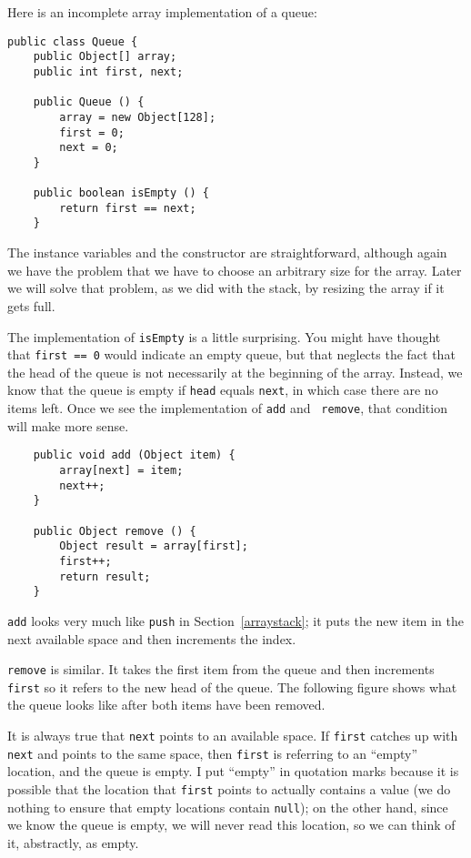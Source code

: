 Here is an incomplete array implementation of a queue:

\begin{verbatim}
public class Queue {
    public Object[] array;
    public int first, next;

    public Queue () {
        array = new Object[128];
        first = 0;
        next = 0;
    }

    public boolean isEmpty () {
        return first == next;
    }
\end{verbatim}
%
The instance variables and the constructor are straightforward,
although again we have the problem that we have to choose an
arbitrary size for the array.  Later we will solve that problem,
as we did with the stack, by resizing the array if it gets full.

The implementation of {\tt isEmpty} is a little surprising.  You might
have thought that {\tt first == 0} would indicate an empty queue, but
that neglects the fact that the head of the queue is not necessarily
at the beginning of the array.  Instead, we know that the queue is
empty if {\tt head} equals {\tt next}, in which case there are no
items left.  Once we see the implementation of {\tt add} and {\tt
remove}, that condition will make more sense.

\begin{verbatim}
    public void add (Object item) {
        array[next] = item;
        next++;
    }

    public Object remove () {
        Object result = array[first];
        first++;
        return result;
    }
\end{verbatim}
%
{\tt add} looks very much like {\tt push} in Section~\ref{arraystack};
it puts the new item in the next available space and then increments
the index.

{\tt remove} is similar.  It takes the first item from the queue
and then increments {\tt first} so it refers to the new head of the queue.
The following figure shows what the queue looks like after both
items have been removed.


It is always true that {\tt next} points to an available space.
If {\tt first} catches up with {\tt next} and points to the same
space, then {\tt first} is referring to an ``empty'' location,
and the queue is empty.  I put ``empty'' in quotation marks because
it is possible that the location that {\tt first} points to actually
contains a value (we do nothing to ensure that empty locations contain
{\tt null}); on the other hand, since we know the queue is empty, we
will never read this location, so we can think of it, abstractly,
as empty.

